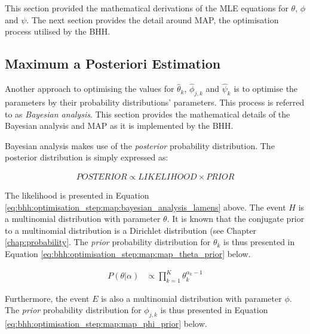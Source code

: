 This section provided the mathematical derivations of the MLE equations for $\theta$, $\phi$ and $\psi$. The next section provides the detail around \ac{MAP}, the optimisation process utilised by the \ac{BHH}.

\subsection{Maximum a Posteriori Estimation}
\label{sec:bhh:optimisation_step:map}

Another approach to optimising the values for $\hat{\theta}_{k}$, $\hat{\phi}_{j,k}$ and $\hat{\psi}_{k}$ is to optimise the parameters by their probability distributions' parameters. This process is referred to as \textit{Bayesian analysis}. This section provides the mathematical details of the Bayesian analysis and \ac{MAP} as it is implemented by the \ac{BHH}.

Bayesian analysis makes use of the \textit{posterior} probability distribution. The posterior distribution is simply expressed as:

\begin{equation*}
      \label{eq:bhh:optimisation_step:map:bayesian_analysis_lamens}
      \begin{split}
            POSTERIOR \propto LIKELIHOOD \times PRIOR
      \end{split}
\end{equation*}

The likelihood is presented in Equation \ref{eq:bhh:optimisation_step:map:bayesian_analysis_lamens} above. The event $H$ is a multinomial distribution with parameter $\theta$. It is known that the conjugate prior to a multinomial distribution is a Dirichlet distribution (see Chapter \ref{chap:probability}. The \textit{prior} probability distribution for  $\theta_{k}$ is thus presented in Equation \ref{eq:bhh:optimisation_step:map:map_theta_prior} below.

\begin{equation}
      \label{eq:bhh:optimisation_step:map:map_theta_prior}
      \begin{split}
            P(\theta | \alpha)
            &\propto \prod_{k=1}^{K} \theta_{k}^{\alpha_{k} -1}
      \end{split}
\end{equation}

Furthermore, the event $E$ is also a multinomial distribution with parameter $\phi$. The \textit{prior} probability distribution for $\phi_{j,k}$ is thus presented in Equation \ref{eq:bhh:optimisation_step:map:map_phi_prior} below.

